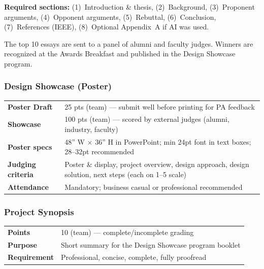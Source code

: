 \noindent\textbf{Required sections:} (1)~Introduction \& thesis, (2)~Background, (3)~Proponent arguments, (4)~Opponent arguments, (5)~Rebuttal, (6)~Conclusion, (7)~References (IEEE), (8)~Optional Appendix~A if AI was used.

\begin{tipbox}
The top 10 essays are sent to a panel of alumni and faculty judges. Winners are recognized at the Awards Breakfast and published in the Design Showcase program.
\end{tipbox}

\subsubsection{Design Showcase (Poster)}
\label{sssec:showcase}

\begin{tabularx}{\textwidth}{lX}
\toprule
\textbf{Poster Draft} & 25 pts (team) --- submit well before printing for PA feedback \\
\textbf{Showcase} & 100 pts (team) --- scored by external judges (alumni, industry, faculty) \\
\textbf{Poster specs} & 48'' W $\times$ 36'' H in PowerPoint; min 24pt font in text boxes; 28--32pt recommended \\
\textbf{Judging criteria} & Poster \& display, project overview, design approach, design solution, next steps (each on 1--5 scale) \\
\textbf{Attendance} & Mandatory; business casual or professional recommended \\
\bottomrule
\end{tabularx}

\subsubsection{Project Synopsis}
\label{sssec:synopsis}

\begin{tabularx}{\textwidth}{lX}
\toprule
\textbf{Points} & 10 (team) --- complete/incomplete grading \\
\textbf{Purpose} & Short summary for the Design Showcase program booklet \\
\textbf{Requirement} & Professional, concise, complete, fully proofread \\
\bottomrule
\end{tabularx}

